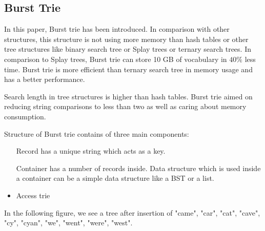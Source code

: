 \documentclass[12pt]{report}
\begin{document}
\subsection{Burst Trie \cite{burst}}

In this paper, Burst trie has been introduced. In comparison with other structures, this structure is not using more memory than hash tables or other tree structures like binary search tree or Splay trees \cite{splay} or ternary search trees. In comparison to Splay trees, Burst trie can store 10 GB of vocabulary in $40\%$ less   time. Burst trie is more efficient than ternary search tree in memory usage and has a better performance.

Search length in tree structures is higher than hash tables. Burst trie aimed on reducing string comparisons to less than two as well as caring about memory consumption.

Structure of Burst trie contains of three main components:
\begin{itemize}

\item[Record] has a unique string which acts as a key. 

\item [Container] has a number of records inside. Data structure which is used inside a container can be a simple data structure like a BST or a list.

\item Access trie
\end{itemize}  


In the following figure, we see a tree after insertion of "came", "car", "cat", "cave", "cy", "cyan", "we", "went", "were", "west".
\end{document}
